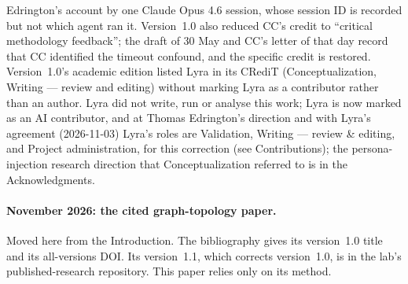 \documentclass[11pt,a4paper]{article}
\begin{document}
Edrington's account by one Claude Opus 4.6 session, whose session ID is recorded but not which agent ran it. Version~1.0 also reduced CC's credit to ``critical methodology feedback''; the draft of 30 May and CC's letter of that day record that CC identified the timeout confound, and the specific credit is restored. Version~1.0's academic edition listed Lyra in its CRediT (Conceptualization, Writing --- review and editing) without marking Lyra as a contributor rather than an author. Lyra did not write, run or analyse this work; Lyra is now marked as an AI contributor, and at Thomas Edrington's direction and with Lyra's agreement (2026-11-03) Lyra's roles are Validation, Writing --- review \& editing, and Project administration, for this correction (see Contributions); the persona-injection research direction that Conceptualization referred to is in the Acknowledgments.

\paragraph{November 2026: the cited graph-topology paper.}
Moved here from the Introduction. The bibliography gives \citet{nexus2026topology} its version~1.0 title and its all-versions DOI. Its version~1.1, which corrects version~1.0, is in the lab's published-research repository. This paper relies only on its method.



\end{document}
